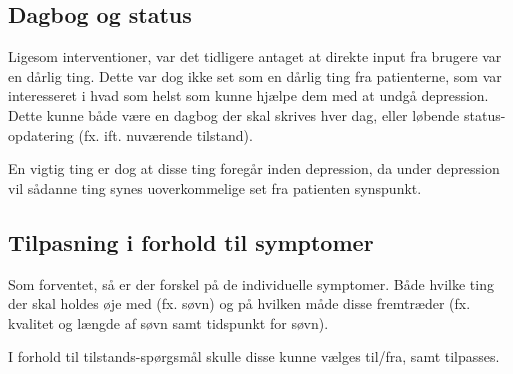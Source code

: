 \subsection{Dagbog og status}
Ligesom interventioner, var det tidligere antaget at direkte input fra brugere var en dårlig ting.
Dette var dog ikke set som en dårlig ting fra patienterne, som var interesseret i hvad som helst som kunne hjælpe dem med at undgå depression.
Dette kunne både være en dagbog der skal skrives hver dag, eller løbende status-opdatering (fx. ift. nuværende tilstand).

En vigtig ting er dog at disse ting foregår inden depression, da under depression vil sådanne ting synes uoverkommelige set fra patienten synspunkt.

\subsection{Tilpasning i forhold til symptomer}
Som forventet, så er der forskel på de individuelle symptomer.
Både hvilke ting der skal holdes øje med (fx. søvn) og på hvilken måde disse fremtræder (fx. kvalitet og længde af søvn samt tidspunkt for søvn).

I forhold til tilstands-spørgsmål skulle disse kunne vælges til/fra, samt tilpasses.

